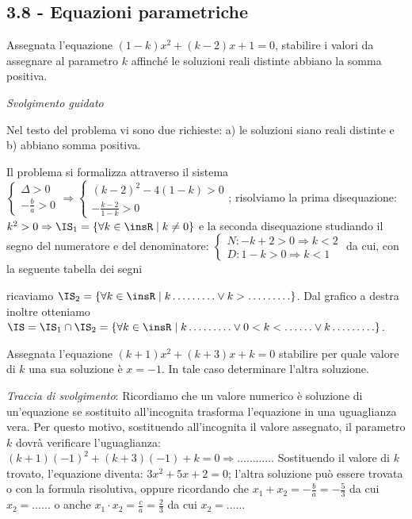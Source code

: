\subsection*{3.8 - Equazioni parametriche}
\begin{esercizio}
 \label{ese:3.98}
Assegnata l'equazione $(1-k) x^{2} + (k-2) x + 1 = 0$, stabilire i valori da assegnare al parametro $k$ affinché le soluzioni reali distinte abbiano la somma positiva.

\emph{Svolgimento guidato}

Nel testo del problema vi sono due richieste: a) le soluzioni siano reali distinte e b) abbiano somma positiva.

Il problema si formalizza attraverso il sistema
$\left\{\begin{array}{l} \Delta > 0 \\- \frac{b}{a} > 0 \end{array}\right.
\Rightarrow \left \{\begin{array}{l} (k-2)^{2}-4 (1-k) > 0 \\-\frac{k-2}{1-k} > 0 \end{array}\right.$; risolviamo la prima disequazione: $k^{2} > 0 \Rightarrow \IS_{1} = \{\forall k \in \insR \mid k \neq 0 \}$ e la seconda disequazione studiando il segno del numeratore e del denominatore:
$\left\{\begin{array}{l} N: -k + 2 > 0 \Rightarrow k < 2 \\
D: 1-k > 0 \Rightarrow k < 1 \end{array}\right.$ da cui, con la seguente tabella dei segni
\begin{center}

\end{center}
ricaviamo $\IS_{2} = \{\forall k \in \insR \mid k \ldots \ldots \ldots \vee k > \ldots \ldots \ldots \}$.
Dal grafico a destra inoltre otteniamo $\IS = \IS_{1} \cap \IS_{2} = \{\forall k \in \insR \mid k
\ldots \ldots \ldots \vee 0 < k < \ldots \ldots \vee k \ldots \ldots \ldots \}$.
\end{esercizio}

\begin{esercizio}
 \label{ese:3.99}
Assegnata l'equazione $(k + 1) x^{2} + (k + 3) x + k = 0$ stabilire per quale valore di $k$ una sua soluzione è $x =-1$. In tale caso determinare l'altra soluzione.

\emph{Traccia di svolgimento}:
Ricordiamo che un valore numerico è soluzione di un'equazione se sostituito all'incognita trasforma l'equazione in una uguaglianza vera.
Per questo motivo, sostituendo all'incognita il valore assegnato, il parametro $k$ dovrà verificare l'uguaglianza: $(k + 1) (- 1)^{2} + (k + 3) (- 1) + k = 0 \Rightarrow\ldots\ldots\ldots\ldots$
Sostituendo il valore di $k$ trovato, l'equazione diventa: $3 x^{2} + 5 x + 2 = 0$; l'altra soluzione può essere trovata o con la formula risolutiva, oppure
ricordando che $x_{1} + x_{2}=- \frac{b}{a}=- \frac{5}{3}$ da cui $x_{2}=\ldots\ldots$ o anche $x_{1} \cdot x_{2}=\frac{c}{a}=\frac{2}{3}$ da cui $x_{2}=\ldots\ldots$
\end{esercizio}

